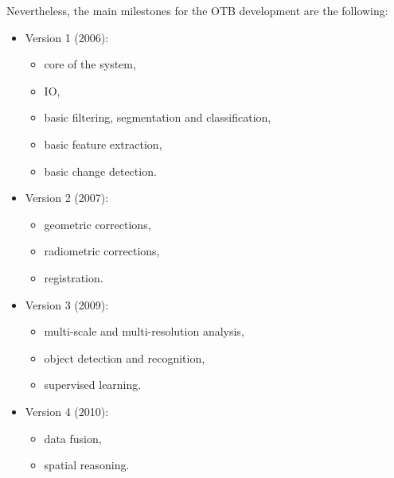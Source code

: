 Nevertheless, the main milestones for the OTB development are the
following:
\begin{itemize}
  \item{Version 1 (2006):}
    \begin{itemize}
    \item core of the system,
    \item IO,
    \item basic filtering, segmentation and classification,
    \item basic feature extraction,
    \item basic change detection.
    \end{itemize}
    \item{Version 2 (2007):}
      \begin{itemize}
      \item geometric corrections,
      \item radiometric corrections,
      \item registration.
      \end{itemize}
    \item{Version 3 (2009):}
      \begin{itemize}
      \item multi-scale and multi-resolution analysis,
      \item object detection and recognition,
      \item supervised learning.
      \end{itemize}
    \item{Version 4 (2010):}
      \begin{itemize}
	\item data fusion,
	\item spatial reasoning.
      \end{itemize}

\end{itemize}

